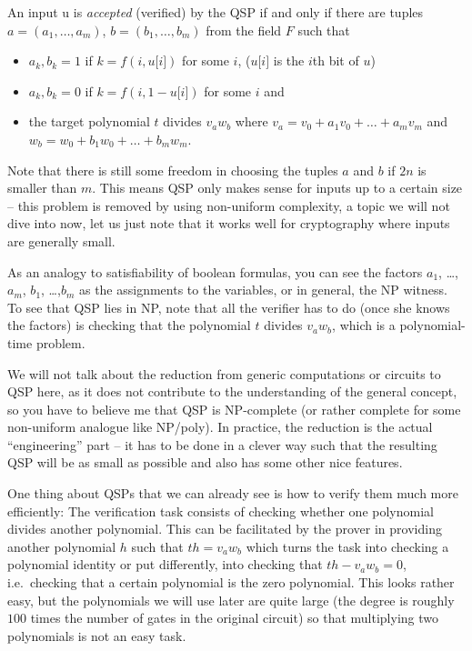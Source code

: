 \documentclass[11pt,letterpaper]{article}
\begin{document}
An input u is \textit{accepted} (verified) by the QSP if and only if there are tuples $a = (a_{1}, \dots,a_{m})$, $b = (b_{1}, \dots,b_{m})$ from the field $F$ such that
\begin{itemize}
\item  $a_{k},b_{k} = 1$ if $k = f(i, u\lbrack i\rbrack)$ for some $i$, ($u\lbrack i\rbrack$ is the $i$th bit of $u$)
\item  $a_{k},b_{k} = 0$ if $k = f(i, 1 - u\lbrack i\rbrack)$ for some $i$ and
\item the target polynomial $t$ divides $v_{a} w_{b}$ where $v_{a} = v_{0} + a_{1} v_{0} +  \dots  + a_{m}v_{m}$ and $w_{b} = w_{0} + b_{1} w_{0} +  \dots  + b_{m}w_{m}$.
\end{itemize}


Note that there is still some freedom in choosing the tuples $a$ and $b$ if $2n$ is smaller than $m$. This means QSP only makes sense for inputs up to a certain size -- this problem is removed by using non-uniform complexity, a topic we will not dive into now, let us just note that it works well for cryptography where inputs are generally small.


As an analogy to satisfiability of boolean formulas, you can see the factors $a_{1}$, \dots,$a_{m}$, $b_{1}$, \dots,$b_{m}$ as the assignments to the variables, or in general, the NP witness. To see that QSP lies in NP, note that all the verifier has to do (once she knows the factors) is checking that the polynomial $t$ divides $v_{a} w_{b}$, which is a polynomial-time problem.

We will not talk about the reduction from generic computations or circuits to QSP here, as it does not contribute to the understanding of the general concept, so you have to believe me that QSP is NP-complete (or rather complete for some non-uniform analogue like NP/poly). In practice, the reduction is the actual ``engineering'' part -- it has to be done in a clever way such that the resulting QSP will be as small as possible and also has some other nice features.


One thing about QSPs that we can already see is how to verify them much more efficiently: The verification task consists of checking whether one polynomial divides another polynomial. This can be facilitated by the prover in providing another polynomial $h$ such that $t h = v_{a} w_{b}$ which turns the task into checking a polynomial identity or put differently, into checking that $t h - v_{a} w_{b} = 0$, i.e.\ checking that a certain polynomial is the zero polynomial. This looks rather easy, but the polynomials we will use later are quite large (the degree is roughly $100$ times the number of gates in the original circuit) so that multiplying two polynomials is not an easy task.
\end{document}
